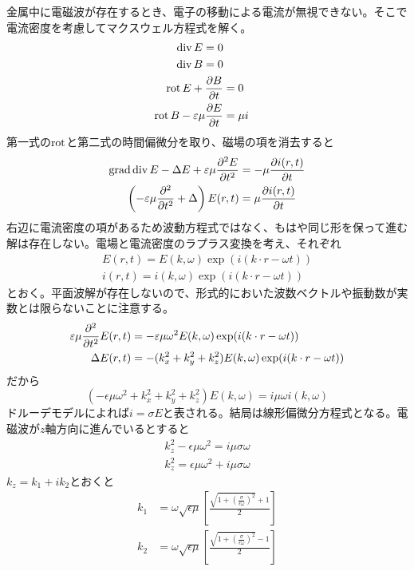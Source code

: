     金属中に電磁波が存在するとき、電子の移動による電流が無視できない。そこで電流密度を考慮してマクスウェル方程式を解く。
    \begin{align*}
        \div E = 0\\
        \div B = 0\\
        \rot E + \pd[B]{t} &= 0\\
        \rot B - \epsilon\mu\pd[E]{t} &= \mu i
    \end{align*}
    第一式の$\rot$と第二式の時間偏微分を取り、磁場の項を消去すると
    \begin{align*}
        \grad\div E - \Delta E + \epsilon\mu\pdd[E]{t} &= - \mu \pd[i(r, t)]{t}\\
        \left(-\epsilon\mu\pdd{t} + \Delta\right)E(r, t) &= \mu\pd[i(r, t)]{t}
    \end{align*}
    右辺に電流密度の項があるため波動方程式ではなく、もはや同じ形を保って進む解は存在しない。電場と電流密度のラプラス変換を考え、それぞれ
    \begin{align*}
        E(r, t) = E(k, \omega)\exp(i(k \cdot r - \omega t))\\
        i(r, t) = i(k, \omega)\exp(i(k \cdot r - \omega t))
    \end{align*}
    とおく。平面波解が存在しないので、形式的においた波数ベクトルや振動数が実数とは限らないことに注意する。
    \begin{align*}
        \epsilon\mu\pdd{t}E(r, t) &= -\epsilon\mu\omega^2 E(k, \omega)\exp(i(k \cdot r - \omega t))\\
        \Delta E(r, t) &= - (k_x^2 + k_y^2 + k_z^2)E(k, \omega)\exp(i(k \cdot r - \omega t))
    \end{align*}
    だから
        \[(-\epsilon\mu\omega^2 + k_x^2 + k_y^2 + k_z^2)E(k, \omega) = i\mu\omega i(k, \omega)\]
    ドルーデモデルによれば$i = \sigma E$と表される。結局は線形偏微分方程式となる。電磁波が$z$軸方向に進んでいるとすると
    \begin{align*}
        k_z^2 - \epsilon\mu\omega^2 = i\mu\sigma\omega\\
        k_z^2 = \epsilon\mu\omega^2 + i\mu\sigma\omega
    \end{align*}
    $k_z = k_1 + ik_2$とおくと
    \begin{align*}
        k_1 &= \omega\sqrt{\epsilon\mu}\left[\frac{\sqrt{1 + \left(\frac{\sigma}{\epsilon\omega}\right)^2} + 1}{2}\right]\\
        k_2 &= \omega\sqrt{\epsilon\mu}\left[\frac{\sqrt{1 + \left(\frac{\sigma}{\epsilon\omega}\right)^2} - 1}{2}\right]
    \end{align*}
